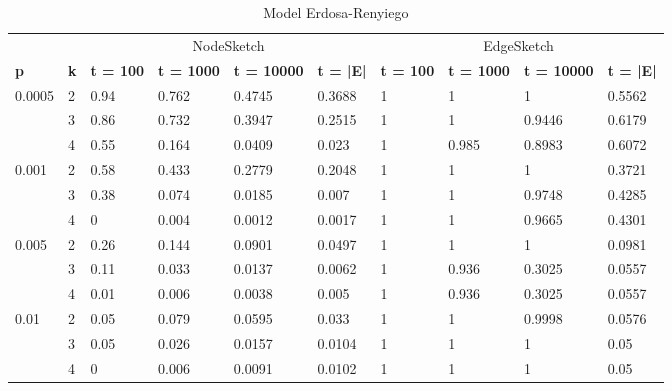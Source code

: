         \begin{table}[!ht]
        \small
            \centering
            \begin{tabular}{|l|l|l|l|l|l|l|l|l|l|}
            \hline
                & & \multicolumn{4}{c|}{NodeSketch} & \multicolumn{4}{c|}{EdgeSketch} \\ \cline{1-10}
                \textbf{p} & \textbf{k} & \textbf{t = 100} & \textbf{t = 1000} & \textbf{t = 10000} & \textbf{t = |E|} & \textbf{t = 100} & \textbf{t = 1000} & \textbf{t = 10000} & \textbf{t = |E|} \\ \hline\hline
                \multirow{3}{*}{0.0005} & 2 & 0.94 & 0.762 & 0.4745 & 0.3688 & 1	& 1	& 1	& 0.5562 \\ \cline{2-10}
                & 3 & 0.86 & 0.732 & 0.3947 & 0.2515	& 1	& 1	& 0.9446 &	0.6179 \\ \cline{2-10}
                & 4 & 0.55 & 0.164 & 0.0409 & 0.023	& 1	& 0.985 & 0.8983 & 0.6072 \\ \hline\hline
                \multirow{3}{*}{0.001} & 2 & 0.58 & 0.433 & 0.2779 & 0.2048	& 1	& 1	& 1	& 0.3721 \\ \cline{2-10}
                & 3 & 0.38 & 0.074 & 0.0185 & 0.007	& 1	& 1	& 0.9748 & 0.4285 \\ \cline{2-10}
                & 4 & 0 & 0.004 & 0.0012 & 0.0017 & 1 & 1 & 0.9665 & 0.4301 \\ \hline\hline
                \multirow{3}{*}{0.005} & 2 & 0.26 & 0.144 & 0.0901 & 0.0497	& 1	& 1	& 1	& 0.0981 \\ \cline{2-10}
                & 3 & 0.11 & 0.033	& 0.0137 & 0.0062 & 1 & 0.936 & 0.3025 & 0.0557 \\ \cline{2-10}
                & 4 & 0.01 & 0.006 & 0.0038 & 0.005	& 1	& 0.936	& 0.3025 & 0.0557 \\ \hline\hline
                \multirow{3}{*}{0.01} & 2 & 0.05 & 0.079 & 0.0595 & 0.033	& 1	& 1	& 0.9998 & 0.0576 \\ \cline{2-10}
                & 3 & 0.05 & 0.026 & 0.0157 & 0.0104	& 1	& 1	& 1	& 0.05 \\ \cline{2-10}
                & 4 & 0 & 0.006 & 0.0091 & 0.0102	& 1	& 1	& 1	& 0.05 \\ \hline
            \end{tabular}
            \label{tab:erdos_renyi}
            \caption{Model Erdosa-Renyiego}

        \end{table}

